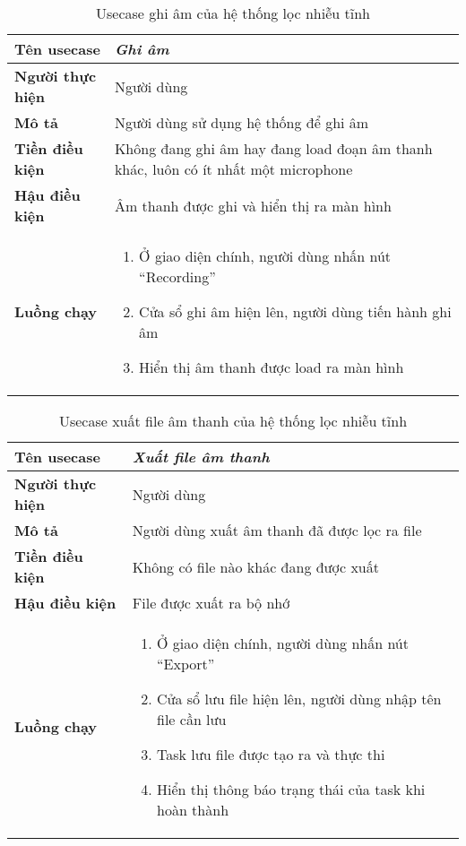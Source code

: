 			\begin{table}[h]
				\centering
				\renewcommand{\tablename}{Usecase}
				\begin{tabular}{p{35mm} p{90mm}}
					\hline
					\textbf{Tên usecase}		& \textit{Ghi âm} \\
					\hline
					\textbf{Người thực hiện}	& Người dùng \\
					\textbf{Mô tả}				& Người dùng sử dụng hệ thống để ghi âm \\
					\textbf{Tiền điều kiện} 	& Không đang ghi âm hay đang load đoạn âm thanh khác, luôn có ít nhất một microphone \\
					\textbf{Hậu điều kiện}		& Âm thanh được ghi và hiển thị ra màn hình \\
					\textbf{Luồng chạy}			& 	\begin{enumerate}[1.]
														\item Ở giao diện chính, người dùng nhấn nút ``Recording''
														\item Cửa sổ ghi âm hiện lên, người dùng tiến hành ghi âm
														\item Hiển thị âm thanh được load ra màn hình
													\end{enumerate}	\\
					\hline
				\end{tabular}
			\caption{Usecase ghi âm của hệ thống lọc nhiễu tĩnh}
			\label{design::static_usecase_2}
			\end{table}
		
			\begin{table}[h]
				\centering
				\renewcommand{\tablename}{Usecase}
				\begin{tabular}{p{35mm} p{90mm}}
					\hline
					\textbf{Tên usecase}		& \textit{Xuất file âm thanh} \\
					\hline
					\textbf{Người thực hiện}	& Người dùng \\
					\textbf{Mô tả}				& Người dùng xuất âm thanh đã được lọc ra file \\
					\textbf{Tiền điều kiện} 	& Không có file nào khác đang được xuất \\
					\textbf{Hậu điều kiện}		& File được xuất ra bộ nhớ \\
					\textbf{Luồng chạy}			& 	\begin{enumerate}[1.]
														\item Ở giao diện chính, người dùng nhấn nút ``Export''
														\item Cửa sổ lưu file hiện lên, người dùng nhập tên file cần lưu
														\item Task lưu file được tạo ra và thực thi
														\item Hiển thị thông báo trạng thái của task khi hoàn thành
													\end{enumerate}	\\
					\hline
				\end{tabular}
			\caption{Usecase xuất file âm thanh của hệ thống lọc nhiễu tĩnh}
			\end{table}
		
